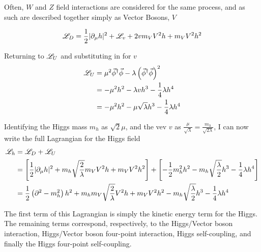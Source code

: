     Often, $W$ and $Z$ field interactions are considered for the same process,
        and as such are described together simply as Vector Bosons, $V$

    \begin{equation} \begin{split}
        \mathscr{L}_D = \frac{1}{2} | \partial_{\mu}h |^2 + \mathscr{L}_v
            + 2 v m_V V^2 h + m_V V^2 h^2
    \end{split} \end{equation}

    Returning to $\mathscr{L}_U$ and substituting in for $v$
    \begin{equation} \begin{split}
        \mathscr{L}_U &= \mu^2 \vec{\phi}^\dag \vec{\phi} - \lambda \left( \vec{\phi}^\dag\vec{\phi} \right)^2
        \\&= - \mu^2 h^2 -\lambda v h^3 - \frac{1}{4} \lambda h^4
        \\&= - \mu^2 h^2 - \mu \sqrt\lambda h^3 - \frac{1}{4} \lambda h^4
    \end{split} \end{equation}

    Identifying the Higgs mass $m_h$ as $\sqrt{2}\mu$,
        and the vev $v$ as $\frac{\mu}{\sqrt{\lambda}} = \frac{m_h}{\sqrt{2 \lambda}}$,
        I can now write the full Lagrangian for the Higgs field\cite{Halzen_book}
    \begin{equation} \begin{split} \label{eq:higgsfull}
        \mathscr{L}_h &= \mathscr{L}_D + \mathscr{L}_U
        \\&= \left[ \frac{1}{2} | \partial_{\mu}h |^2
            + m_h \sqrt{\frac{2}{\lambda}}  m_V V^2 h + m_V V^2 h^2 \right]
            + \left[ - \frac{1}{2} m^2_h h^2 - m_h \sqrt{\frac{\lambda}{2}} h^3 - \frac{1}{4} \lambda h^4 \right]
        \\&= \frac{1}{2} \left(\partial^2 - m_h^2 \right) h^2
            + m_h m_V \sqrt{\frac{2}{\lambda}} V^2 h + m_V V^2 h^2
            - m_h \sqrt{\frac{\lambda}{2}} h^3 - \frac{1}{4} \lambda h^4
    \end{split} \end{equation}

    The first term of this Lagrangian is simply the kinetic energy term for the Higgs.
    The remaining terms correspond, respectively,
        to the Higgs/Vector boson interaction,
        Higgs/Vector boson four-point interaction,
        Higgs self-coupling,
        and finally the Higgs four-point self-coupling.

